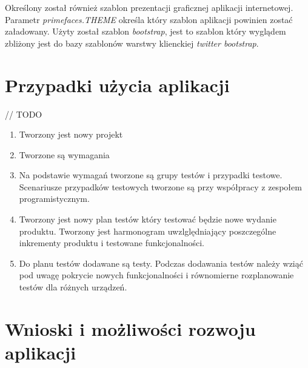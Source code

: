 Określony został również szablon prezentacji graficznej aplikacji internetowej. Parametr \textit{primefaces.THEME} określa który szablon aplikacji powinien zostać załadowany. Użyty został szablon \textit{bootstrap}, jest to szablon który wyglądem zbliżony jest do bazy szablonów warstwy klienckiej \textit{twitter bootstrap}. 


\chapter{Przypadki użycia aplikacji}
// TODO 
\begin{enumerate}
  \item Tworzony jest nowy projekt
  \item Tworzone są wymagania
  \item Na podstawie wymagań tworzone są grupy testów i przypadki testowe. Scenariusze przypadków testowych tworzone są przy współpracy z zespołem programistycznym.
  \item Tworzony jest nowy plan testów który testować będzie nowe wydanie produktu. Tworzony jest harmonogram uwzlględniający poszczególne inkrementy produktu i testowane funkcjonalności.
  \item Do planu testów dodawane są testy. Podczas dodawania testów należy wziąć pod uwagę pokrycie nowych funkcjonalności i równomierne rozplanowanie testów dla różnych urządzeń.

\end{enumerate}

\chapter{Wnioski i możliwości rozwoju aplikacji}
